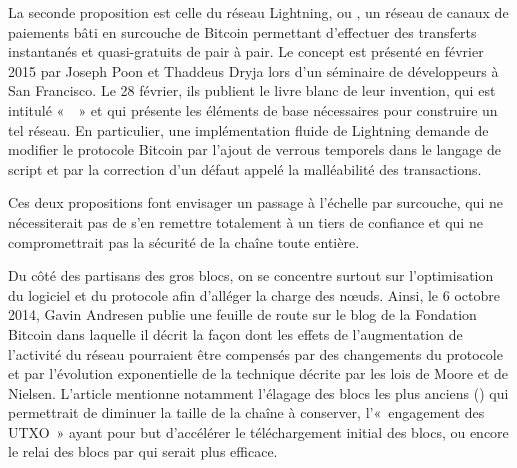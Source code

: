 
La seconde proposition est celle du réseau Lightning, ou , un réseau de canaux de paiements bâti en surcouche de Bitcoin permettant d'effectuer des transferts instantanés et quasi-gratuits de pair à pair. Le concept est présenté en février 2015 par Joseph Poon et Thaddeus Dryja lors d'un séminaire de développeurs à San Francisco. Le 28 février, ils publient le livre blanc de leur invention, qui est intitulé «~~» et qui présente les éléments de base nécessaires pour construire un tel réseau. En particulier, une implémentation fluide de Lightning demande de modifier le protocole Bitcoin par l'ajout de verrous temporels dans le langage de script et par la correction d'un défaut appelé la malléabilité des transactions.

Ces deux propositions font envisager un passage à l'échelle par surcouche, qui ne nécessiterait pas de s'en remettre totalement à un tiers de confiance et qui ne compromettrait pas la sécurité de la chaîne toute entière.

Du côté des partisans des gros blocs, on se concentre surtout sur l'optimisation du logiciel et du protocole afin d'alléger la charge des nœuds. Ainsi, le 6 octobre 2014, Gavin Andresen publie une feuille de route sur le blog de la Fondation Bitcoin dans laquelle il décrit la façon dont les effets de l'augmentation de l'activité du réseau pourraient être compensés par des changements du protocole et par l'évolution exponentielle de la technique décrite par les lois de Moore et de Nielsen. L'article mentionne notamment l'élagage des blocs les plus anciens () qui permettrait de diminuer la taille de la chaîne à conserver, l'«~engagement des UTXO~» ayant pour but d'accélérer le téléchargement initial des blocs, ou encore le relai des blocs par  qui serait plus efficace.

